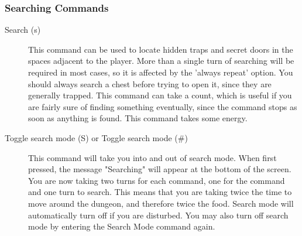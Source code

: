 \subsubsection{Searching Commands} \begin{description} \item[Search (s)]
        This command can be used to locate hidden traps and secret doors
        in the spaces adjacent to the player. More than a single turn of
        searching will be required in most cases, so it is affected by
        the 'always repeat' option. You should always search a chest
        before trying to open it, since they are generally trapped. This
        command can take a count, which is useful if you are fairly sure
        of finding something eventually, since the command stops as soon
        as anything is found. This command takes some energy.

    \item[Toggle search mode (S) or Toggle search mode (\#)] This command
        will take you into and out of search mode. When first pressed,
        the message "Searching" will appear at the bottom of the screen.
        You are now taking two turns for each command, one for the
        command and one turn to search. This means that you are taking
        twice the time to move around the dungeon, and therefore twice
        the food. Search mode will automatically turn off if you are
        disturbed. You may also turn off search mode by entering the
        Search Mode command again.  \end{description}

